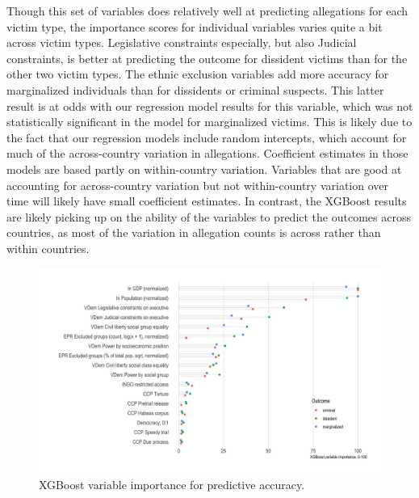 \documentclass[11pt]{article}
\begin{document}
Though this set of variables does relatively well at predicting allegations for each victim type, the importance scores for individual variables varies quite a bit across victim types. Legislative constraints especially, but also Judicial constraints, is better at predicting the outcome for dissident victims than for the other two victim types. The ethnic exclusion variables add more accuracy for marginalized individuals than for dissidents or criminal suspects. This latter result is at odds with our regression model results for this variable, which was not statistically significant in the model for marginalized victims. This is likely due to the fact that our regression models include random intercepts, which account for much of the across-country variation in allegations. Coefficient estimates in those models are based partly on within-country variation. Variables that are good at accounting for across-country variation but not within-country variation over time will likely have small coefficient estimates. In contrast, the XGBoost results are likely picking up on the ability of the variables to predict the outcomes across countries, as most of the variation in allegation counts is across rather than within countries.  

\begin{figure}
\begin{center}
\caption{XGBoost variable importance for predictive accuracy.}
\label{var-imp}
\includegraphics[width=.99\textwidth]{../output/figures/xgboost-variable-importance-v1.png}
\end{center}
\end{figure}

\end{document}
